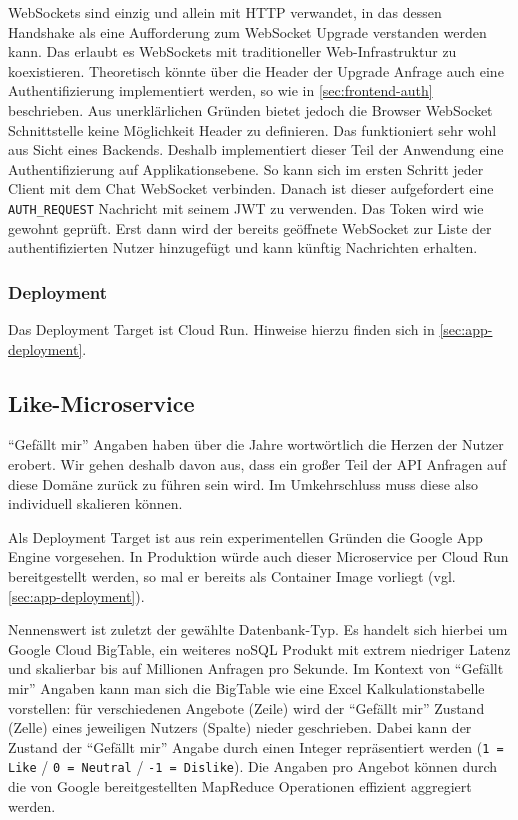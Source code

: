 \documentclass{article}
\begin{document}
WebSockets sind einzig und allein mit HTTP verwandet, in das dessen Handshake als eine Aufforderung zum WebSocket Upgrade verstanden werden kann. Das erlaubt es WebSockets mit traditioneller Web-Infrastruktur zu koexistieren. Theoretisch könnte über die Header der Upgrade Anfrage auch eine Authentifizierung implementiert werden, so wie in \autoref{sec:frontend-auth} beschrieben. Aus unerklärlichen Gründen bietet jedoch die Browser WebSocket Schnittstelle keine Möglichkeit Header zu definieren. Das funktioniert sehr wohl aus Sicht eines Backends. Deshalb implementiert dieser Teil der Anwendung eine Authentifizierung auf Applikationsebene. So kann sich im ersten Schritt jeder Client mit dem Chat WebSocket verbinden. Danach ist dieser aufgefordert eine \texttt{AUTH\_REQUEST} Nachricht mit seinem JWT zu verwenden. Das Token wird wie gewohnt geprüft. Erst dann wird der bereits geöffnete WebSocket zur Liste der authentifizierten Nutzer hinzugefügt und kann künftig Nachrichten erhalten.


\subsubsection{Deployment}

Das Deployment Target ist Cloud Run. Hinweise hierzu finden sich in \autoref{sec:app-deployment}.


\subsection{Like-Microservice}


\enquote{Gefällt mir} Angaben haben über die Jahre wortwörtlich die Herzen der Nutzer erobert. Wir gehen deshalb davon aus, dass ein großer Teil der API Anfragen auf diese Domäne zurück zu führen sein wird. Im Umkehrschluss muss diese also individuell skalieren können.

Als Deployment Target ist aus rein experimentellen Gründen die Google App Engine vorgesehen. In Produktion würde auch dieser Microservice per Cloud Run bereitgestellt werden, so mal er bereits als Container Image vorliegt (vgl. \autoref{sec:app-deployment}).

Nennenswert ist zuletzt der gewählte Datenbank-Typ. Es handelt sich hierbei um Google Cloud BigTable, ein weiteres noSQL Produkt mit extrem niedriger Latenz und skalierbar bis auf Millionen Anfragen pro Sekunde. Im Kontext von \enquote{Gefällt mir} Angaben kann man sich die BigTable wie eine Excel Kalkulationstabelle vorstellen: für verschiedenen Angebote (Zeile) wird der \enquote{Gefällt mir} Zustand (Zelle) eines jeweiligen Nutzers (Spalte) nieder geschrieben. Dabei kann der Zustand der \enquote{Gefällt mir} Angabe durch einen Integer repräsentiert werden (\texttt{1 = Like} / \texttt{0 = Neutral} / \texttt{-1 = Dislike}). Die Angaben pro Angebot können durch die von Google bereitgestellten MapReduce Operationen effizient aggregiert werden.
\end{document}
